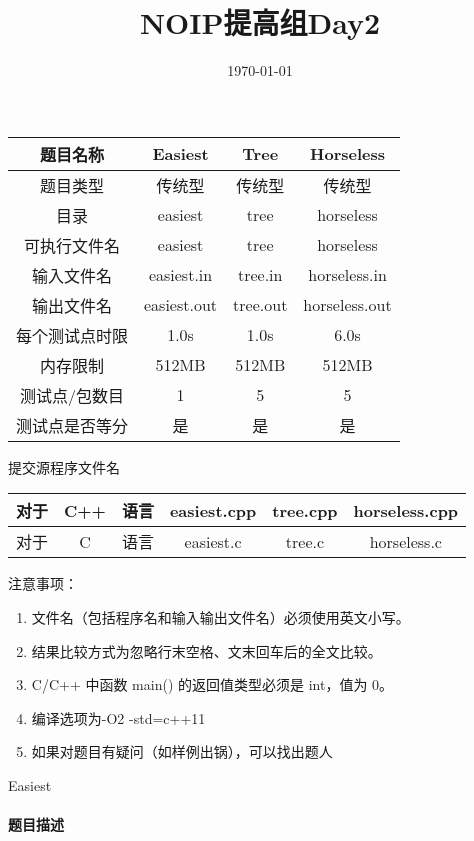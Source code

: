 \documentclass[UTF8]{ctexart}
\begin{document}
\title{NOIP提高组Day2}
\author{}
\date{\today}
\maketitle
\begin{table}[!htbp]
	\centering
	\begin{tabular}{|c|c|c|c|}
		\hline
		题目名称&Easiest&Tree&Horseless\\
		\hline
		题目类型&传统型&传统型&传统型\\
		\hline
		目录&easiest&tree&horseless\\
		\hline
		可执行文件名&easiest&tree&horseless\\
		\hline
		输入文件名&easiest.in&tree.in&horseless.in\\
		\hline
		输出文件名&easiest.out&tree.out&horseless.out\\
		\hline
		每个测试点时限&1.0s&1.0s&6.0s\\
		\hline
		内存限制&512MB&512MB&512MB\\
		\hline
		测试点/包数目&1&5&5\\
		\hline
		测试点是否等分&是&是&是\\
		\hline
	\end{tabular}
\end{table}
提交源程序文件名
\begin{table}[!htbp]
	\centering
	\begin{tabular}{|ccc|c|c|c|}
		\hline
		对于&C++&语言&easiest.cpp&tree.cpp&horseless.cpp\\
		\hline
		对于&C&语言&easiest.c&tree.c&horseless.c\\
		\hline
	\end{tabular}
\end{table}
注意事项：
\begin{enumerate}
	\item 文件名（包括程序名和输入输出文件名）必须使用英文小写。
	\item 结果比较方式为忽略行末空格、文末回车后的全文比较。
	\item C/C++ 中函数 main() 的返回值类型必须是 int，值为 0。
	\item 编译选项为-O2 -std=c++11
	\item 如果对题目有疑问（如样例出锅），可以找出题人
\end{enumerate}
\clearpage


\begin{center}
	\large{Easiest}
\end{center}
\paragraph{题目描述}
\end{document}
